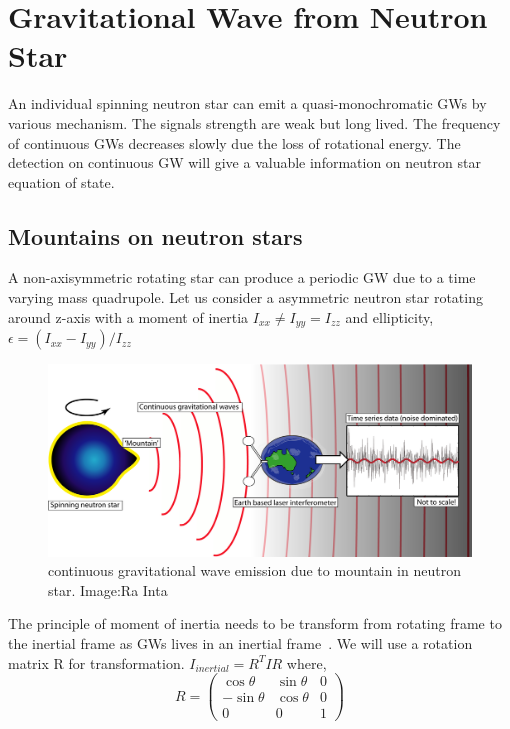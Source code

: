 \documentclass{ttuthes2007}
\begin{document}
\section{Gravitational Wave from Neutron Star}
An individual spinning neutron star can emit a quasi-monochromatic \acp{GW} by
various mechanism. The signals strength are weak but long lived. The frequency
of continuous \acp{GW} decreases slowly due the loss of rotational energy. The
detection on continuous \ac{GW} will give a valuable information on neutron star
equation of state.

\subsection{Mountains on neutron stars}
A non-axisymmetric rotating star can produce a periodic \ac{GW} due to a time
varying mass quadrupole. Let us consider a asymmetric neutron star rotating
around z-axis with a moment of inertia $I_{xx}\neq I_{yy}=I_{zz}$ and
ellipticity,$\epsilon=(I_{xx}-I_{yy})/I_{zz}$

\begin{figure}[h!]                                                            
        \includegraphics[width=\textwidth]{figure/CW.png}                 
        \caption{continuous gravitational wave emission due to mountain in
neutron star. Image:Ra Inta}
        \label{fig:CW}                                                 
\end{figure}     

The principle of moment of inertia needs to be transform from rotating frame to 
the inertial frame as \acp{GW} lives in an inertial frame~\cite{PhysRevD.20.351}. 
We will use a rotation matrix R for transformation.
$I_{inertial}= R^T I R$
where, 
\begin{equation}
R=
\begin{pmatrix}
\cos\theta & \sin\theta & 0 \\
-\sin\theta & \cos\theta & 0 \\
0 & 0 & 1
\end{pmatrix}
\end{equation}
\end{document}
